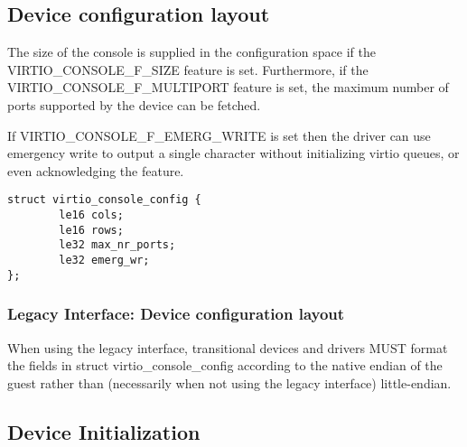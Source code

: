 \subsection{Device configuration layout}\label{sec:Device Types / Console Device / Device configuration layout}

  The size of the console is supplied
  in the configuration space if the VIRTIO_CONSOLE_F_SIZE feature
  is set. Furthermore, if the VIRTIO_CONSOLE_F_MULTIPORT feature
  is set, the maximum number of ports supported by the device can
  be fetched.

  If VIRTIO_CONSOLE_F_EMERG_WRITE is set then the driver can use emergency write
  to output a single character without initializing virtio queues, or even
  acknowledging the feature.

\begin{lstlisting}
struct virtio_console_config {
        le16 cols;
        le16 rows;
        le32 max_nr_ports;
        le32 emerg_wr;
};
\end{lstlisting}

\subsubsection{Legacy Interface: Device configuration layout}\label{sec:Device Types / Console Device / Device configuration layout / Legacy Interface: Device configuration layout}
When using the legacy interface, transitional devices and drivers
MUST format the fields in struct virtio_console_config
according to the native endian of the guest rather than
(necessarily when not using the legacy interface) little-endian.

\subsection{Device Initialization}\label{sec:Device Types / Console Device / Device Initialization}


